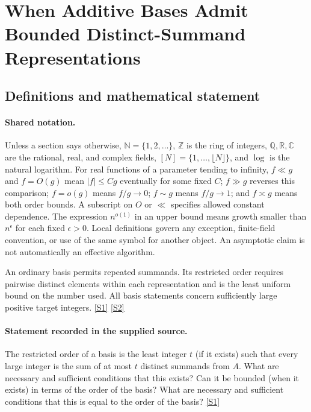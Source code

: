 \documentclass[11pt,a4paper]{article}
\newcommand{\N}{\mathbb{N}}
\newcommand{\Z}{\mathbb{Z}}
\newcommand{\Q}{\mathbb{Q}}
\newcommand{\R}{\mathbb{R}}
\newcommand{\C}{\mathbb{C}}
\newcommand{\sref}[2]{\hyperlink{source:#1:#2}{[S#2]}}
\begin{document}
\section{When Additive Bases Admit Bounded Distinct-Summand Representations}\label{statement}


\subsection{Definitions and mathematical statement}

\paragraph{Shared notation.}Unless a section says otherwise, $\N=\{1,2,\ldots\}$,
$\Z$ is the ring of integers, $\Q,\R,\C$ are the rational, real, and complex
fields, $[N]=\{1,\ldots,\lfloor N\rfloor\}$, and $\log$ is the natural
logarithm. For real functions of a parameter tending to infinity,
$f\ll g$ and $f=O(g)$ mean $|f|\leq Cg$ eventually for some fixed $C$;
$f\gg g$ reverses this comparison; $f=o(g)$ means $f/g\to0$;
$f\sim g$ means $f/g\to1$; and $f\asymp g$ means both order bounds.
A subscript on $O$ or $\ll$ specifies allowed constant dependence.
The expression $n^{o(1)}$ in an upper bound means growth smaller than
$n^\epsilon$ for each fixed $\epsilon>0$. Local definitions govern any
exception, finite-field convention, or use of the same symbol for another
object. An asymptotic claim is not automatically an effective algorithm.



An ordinary basis permits repeated summands. Its restricted order requires pairwise distinct elements within each representation and is the least uniform bound on the number used. All basis statements concern sufficiently large positive target integers. \sref{statement}{1} \sref{statement}{2}

\paragraph{Statement recorded in the supplied source.}
The restricted order of a basis is the least integer $t$ (if it exists) such that every large integer is the sum of at most $t$ distinct summands from $A$. What are necessary and sufficient conditions that this exists? Can it be bounded (when it exists) in terms of the order of the basis? What are necessary and sufficient conditions that this is equal to the order of the basis? \sref{statement}{1}
\end{document}

